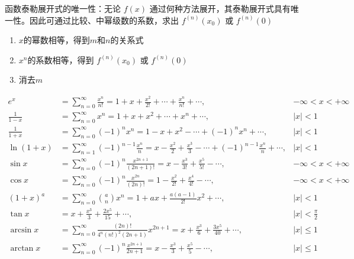 \documentclass[a4paper,12pt]{article}
\begin{document}
\begin{enumerate}
\begin{circlenum}
            \item 函数泰勒展开式的唯一性：无论 $f(x)$ 通过何种方法展开，其泰勒展开式具有唯一性。因此可通过比较、中幂级数的系数，求出 $f^{(n)}(x_0)$ 或 $f^{(n)}(0)$
            \begin{enumerate}
                \item $x$的幂数相等，得到$m$和$n$的关系式
                \item $x^n$的系数相等，得到 $f^{(n)}(x_0)$ 或 $f^{(n)}(0)$
                \item 消去$m$
            \end{enumerate}
        \end{circlenum}
        \[
            \begin{aligned}
                e^x &= \sum_{n=0}^{\infty} \frac{x^n}{n!} = 1 + x + \frac{x^2}{2!} + \cdots + \frac{x^n}{n!} + \cdots, & -\infty < x < +\infty \\
                \frac{1}{1-x} &= \sum_{n=0}^{\infty} x^n = 1 + x + x^2 + \cdots + x^n + \cdots, & |x| < 1 \\
                \frac{1}{1+x} &= \sum_{n=0}^{\infty} (-1)^n x^n = 1 - x + x^2 - \cdots + (-1)^n x^n + \cdots, & |x| < 1 \\
                \ln(1+x) &= \sum_{n=1}^{\infty} (-1)^{n-1} \frac{x^n}{n} = x - \frac{x^2}{2} + \frac{x^3}{3} - \cdots + (-1)^{n-1} \frac{x^n}{n} + \cdots, & |x| < 1 \\
                \sin x &= \sum_{n=0}^{\infty} (-1)^n \frac{x^{2n+1}}{(2n+1)!} = x - \frac{x^3}{3!} + \frac{x^5}{5!} - \cdots, & -\infty < x < +\infty \\
                \cos x &= \sum_{n=0}^{\infty} (-1)^n \frac{x^{2n}}{(2n)!} = 1 - \frac{x^2}{2!} + \frac{x^4}{4!} - \cdots, & -\infty < x < +\infty \\
                (1+x)^a &= \sum_{n=0}^{\infty} \binom{a}{n} x^n = 1 + ax + \frac{a(a-1)}{2!} x^2 + \cdots, & |x| < 1 \\
                \tan x &= x + \frac{x^3}{3} + \frac{2x^5}{15} + \cdots, & |x| < \frac{\pi}{2} \\
                \arcsin x &= \sum_{n=0}^{\infty} \frac{(2n)!}{4^n (n!)^2 (2n+1)} x^{2n+1} = x + \frac{x^3}{6} + \frac{3x^5}{40} + \cdots, & |x| \le 1 \\
                \arctan x &= \sum_{n=0}^{\infty} (-1)^n \frac{x^{2n+1}}{2n+1} = x - \frac{x^3}{3} + \frac{x^5}{5} - \cdots, & |x| \le 1
            \end{aligned}
        \]
    \end{enumerate}
\end{document}
